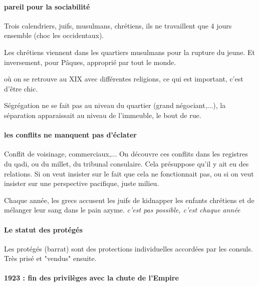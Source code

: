 \paragraph{pareil pour la sociabilité} Trois calendriers, juifs, musulmans, chrétiens, ils ne travaillent que 4 jours ensemble (choc les occidentaux). 
\begin{Ex}
    Les chrétiens viennent dans les quartiers musulmans pour la rupture du jeune. Et inversement, pour Pâques, approprié par tout le monde.
\end{Ex}

\begin{Ex}
    où on se retrouve au XIX avec différentes religions, ce qui est important, c'est d'être chic.
\end{Ex}

\begin{Ex}[Alexandrie]
    Ségrégation ne se fait pas au niveau du quartier (grand négociant,...), la séparation apparaissait au niveau de l'immeuble, le bout de rue. 
\end{Ex}

\paragraph{les conflits ne manquent pas d'éclater} Conflit de voisinage, commerciaux,... On découvre ces conflits dans les registres du qadi, ou du millet, du tribunal consulaire. Cela présuppose qu'il y ait eu des relations.
Si on veut insister sur le fait que cela ne fonctionnait pas, ou si on veut insister sur une perspective pacifique, juste milieu. 

\begin{Ex}
    Chaque année, les grecs accusent les juifs de kidnapper les enfants chrétiens et de mélanger leur sang dans le pain azyme. \textit{c'est pas possible, c'est chaque année}
\end{Ex}

\paragraph{Le statut des protégés} Les protégés (barrat) sont des protections individuelles accordées par les consuls. Très prisé et "vendus" ensuite.

\paragraph{1923 : fin des privilèges avec la chute de l'Empire} 



